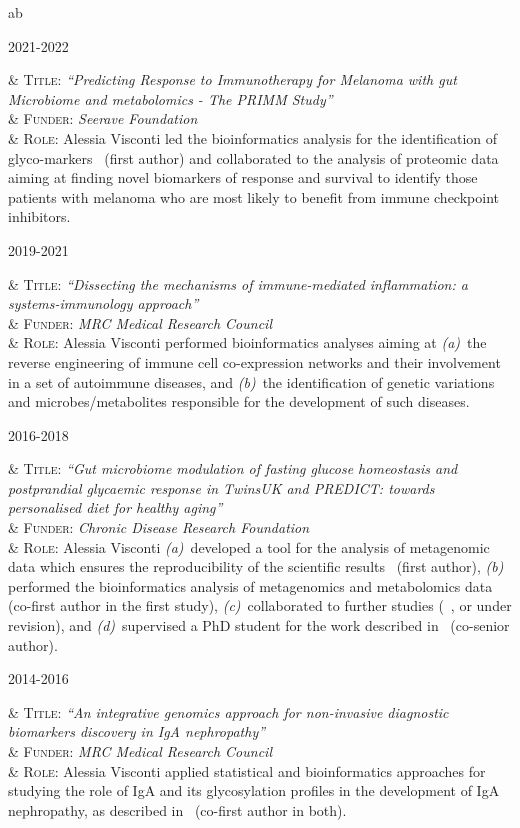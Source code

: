 \documentclass[a4paper,10pt]{article}
\newenvironment{singletablelist}
{	\vspace{-0.2cm}
	\begin{longtable}[!h]{ab}}{\end{longtable}
}
\newcommand{\stlist}[2]{
	\hspace{-3cm}
	\noindent
	\begin{minipage}{0.24\textwidth}
	\begin{flushright}
	\textsc{#1}
	\end{flushright}
	\end{minipage}
	& #2\\[0.2cm]
}
\begin{document}
\begin{singletablelist}

	\stlist{2021-2022}{
		\textsc{Title:} \emph{``Predicting Response to Immunotherapy for Melanoma with gut Microbiome and metabolomics - The PRIMM Study''}\\
		& \textsc{Funder:} \emph{Seerave Foundation}\\
		& \textsc{Role:} Alessia Visconti led the bioinformatics analysis for the identification of glyco-markers~\cite{Vis23} (first author) and collaborated to the analysis of proteomic data~\cite{Ros22} aiming at finding novel biomarkers of response and survival to identify those patients with melanoma who are most likely to benefit from immune checkpoint inhibitors.}
	
	\stlist{2019-2021}{ 
		\textsc{Title:} \emph{``Dissecting the mechanisms of immune-mediated inflammation: a systems-immunology approach''}\\
		& \textsc{Funder:} \emph{MRC Medical Research Council}\\
		& \textsc{Role:} Alessia Visconti performed bioinformatics analyses aiming at \emph{(a)}~the reverse engineering of immune cell co-expression networks and their involvement in a set of autoimmune diseases, and \emph{(b)}~the identification of genetic variations and microbes/metabolites responsible for the development of such diseases.}
	
	\stlist{2016-2018}{ 
		\textsc{Title:} \emph{``Gut microbiome modulation of fasting glucose homeostasis and postprandial glycaemic response in TwinsUK and PREDICT: towards personalised diet for healthy aging''}\\
		& \textsc{Funder:} \emph{Chronic Disease Research Foundation}\\
		& \textsc{Role:} Alessia Visconti \emph{(a)}~developed a tool for the analysis of metagenomic data which ensures the reproducibility of the scientific results~\cite{Vis18b} (first author), \emph{(b)} performed the bioinformatics analysis of metagenomics and metabolomics data~\cite{Vis19,Bar20} (co-first author in the first study), \emph{(c)}~collaborated to further studies (~\cite{Lou23,Nog23a,Nog23b}, or under revision), and \emph{(d)}~supervised a PhD student for the work described in~\cite{Zha22} (co-senior author).}

	\stlist{2014-2016}{  
		\textsc{Title:} \emph{``An integrative genomics approach for non-invasive diagnostic biomarkers discovery in IgA nephropathy''}\\
		& \textsc{Funder:} \emph{MRC Medical Research Council}\\
		& \textsc{Role:} Alessia Visconti applied statistical and bioinformatics approaches for studying the role of IgA and its glycosylation profiles in the development of IgA nephropathy, as described in~\cite{Lom16,Dot21} (co-first author in both).}
	

\end{singletablelist}
\end{document}
